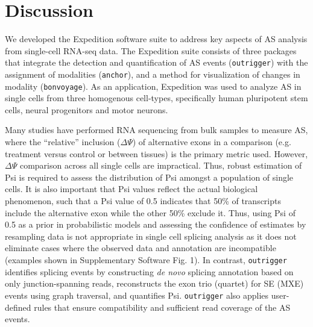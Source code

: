 \section{Discussion}
We developed the Expedition software suite to address key aspects of AS analysis from single-cell RNA-seq data. The Expedition suite consists of three packages that integrate the detection and quantification of AS events (\texttt{outrigger}) with the assignment of modalities (\texttt{anchor}), and a method for visualization of changes in modality (\texttt{bonvoyage}). As an application, Expedition was used to analyze AS in single cells from three homogenous cell-types, specifically human pluripotent stem cells, neural progenitors and motor neurons.

Many studies have performed RNA sequencing from bulk samples to measure AS, where the ``relative'' inclusion ($\Delta\Psi$) of alternative exons in a comparison (e.g. treatment versus control or between tissues) is the primary metric used. However, $\Delta\Psi$ comparison across all single cells are impractical. Thus, robust estimation of Psi is required to assess the distribution of Psi amongst a population of single cells. It is also important that Psi values reflect the actual biological phenomenon, such that a Psi value of 0.5 indicates that 50\% of transcripts include the alternative exon while the other 50\% exclude it. Thus, using Psi of 0.5 as a prior in probabilistic models and assessing the confidence of estimates by resampling data \cite{Katz:2010iv} is not appropriate in single cell splicing analysis as it does not eliminate cases where the observed data and annotation are incompatible (examples shown in Supplementary Software Fig. 1). In contrast, \texttt{outrigger} identifies splicing events by constructing \emph{de novo} splicing annotation based on only junction-spanning reads, reconstructs the exon trio (quartet) for SE (MXE) events using graph traversal, and quantifies Psi. \texttt{outrigger} also applies user-defined rules that ensure compatibility and sufficient read coverage of the AS events.

